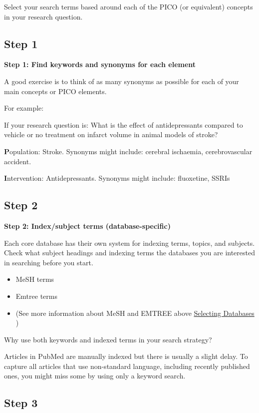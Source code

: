\documentclass[
]{book}
\providecommand{\tightlist}{%
  \setlength{\itemsep}{0pt}\setlength{\parskip}{0pt}}
\begin{document}
Select your search terms based around each of the PICO (or equivalent) concepts in your research question.

\hypertarget{step-1}{%
\subsection{Step 1}\label{step-1}}

\textbf{Step 1: Find keywords and synonyms for each element}

A good exercise is to think of as many synonyms as possible for each of your main concepts or PICO elements.

For example:

If your research question is: What is the effect of antidepressants compared to vehicle or no treatment on infarct volume in animal models of stroke?

\textbf{P}opulation: Stroke. Synonyms might include: cerebral ischaemia, cerebrovascular accident.

\textbf{I}ntervention: Antidepressants. Synonyms might include: fluoxetine, SSRIs

\hypertarget{step-2}{%
\subsection{Step 2}\label{step-2}}

\textbf{Step 2: Index/subject terms (database-specific)}

Each core database has their own system for indexing terms, topics, and subjects. Check what subject headings and indexing terms the databases you are interested in searching before you start.

\begin{itemize}
\tightlist
\item
  MeSH terms
\item
  Emtree terms
\item
  (See more information about MeSH and EMTREE above \protect\hyperlink{Selecting-Databases}{Selecting Databases} )
\end{itemize}

Why use both keywords and indexed terms in your search strategy?

Articles in PubMed are manually indexed but there is usually a slight delay. To capture all articles that use non-standard language, including recently published ones, you might miss some by using only a keyword search.

\hypertarget{step-3}{%
\subsection{Step 3}\label{step-3}}
\end{document}
